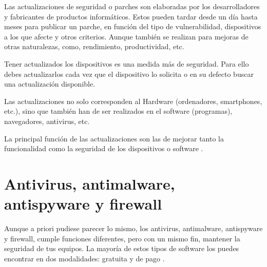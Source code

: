 \documentclass[
  spanish,
  a4paper,
  openany]{book}
\begin{document}
Las actualizaciones de seguridad o parches son elaboradas por los desarrolladores y fabricantes de productos informáticos. Estos pueden tardar desde un día hasta meses para publicar un parche, en función del tipo de vulnerabilidad, dispositivos a los que afecte y otros criterios. Aunque también se realizan para mejoras de otras naturalezas, como, rendimiento, productividad, etc.

Tener actualizados los dispositivos es una medida más de seguridad. Para ello debes actualizarlos cada vez que el dispositivo lo solicita o en su defecto buscar una actualización disponible.

Las actualizaciones no solo corresponden al Hardware (ordenadores, smartphones, etc.), sino que también han de ser realizados en el software (programas), navegadores, antivirus, etc.

La principal función de las actualizaciones son las de mejorar tanto la funcionalidad como la seguridad de los dispositivos o software \citep{OSI-actualizaciones}.

\hypertarget{antivirus-antimalware-antispyware-y-firewall}{%
\section{Antivirus, antimalware, antispyware y firewall}\label{antivirus-antimalware-antispyware-y-firewall}}

Aunque a priori pudiese parecer lo mismo, los antivirus, antimalware, antispyware y firewall, cumple funciones diferentes, pero con un mismo fin, mantener la seguridad de tus equipos. La mayoría de estos tipos de software los puedes encontrar en dos modalidades: gratuita y de pago \citep{software-seguridad}.
\end{document}
